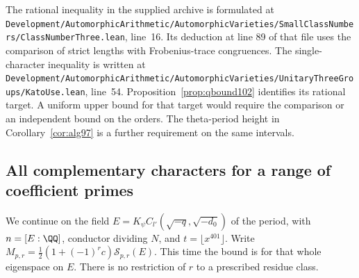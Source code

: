 \documentclass[a4paper,11pt]{article}
\theoremstyle{definition}
\theoremstyle{remark}
\newcommand{\srcloc}[2]{{\small\nolinkurl{#1.lean}}, line~#2}
\numberwithin{equation}{section}
\begin{document}
The rational inequality in the supplied archive is formulated at
\srcloc{Development/AutomorphicArithmetic/AutomorphicVarieties/SmallClassNumbers/ClassNumberThree}{16}.
Its deduction at line 89 of that file uses the comparison of
strict lengths with Frobenius-trace congruences. The single-character
inequality is written at
\srcloc{Development/AutomorphicArithmetic/AutomorphicVarieties/UnitaryThreeGroups/KatoUse}{54}.
Proposition~\ref{prop:qbound102} identifies its rational target.
A uniform upper bound for that target would require the comparison
or an independent bound on the orders. The theta-period height in
Corollary~\ref{cor:alg97} is a further requirement on the same
intervals.

\subsection{All complementary characters for a range of coefficient primes}\label{nav:II-32}
We continue on the field \(E=K_\psi C_{l'}(\sqrt{-q},\sqrt{-d_0})\)
of the period, with \(n=[E:\QQ]\), conductor dividing \(N\),
and \(t=\lfloor x^{401}\rfloor\).
Write \(M_{p,r}=\tfrac12(1+(-1)^r c)\mathcal S_{p,r}(E)\).
This time the bound is for that whole eigenspace on \(E\).
There is no restriction of \(r\) to a prescribed residue class.
\end{document}
